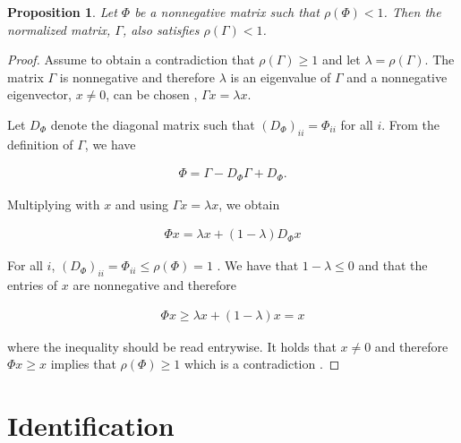 \documentclass[accepted]{uai2021} %
\newtheorem{prop}[thm]{Proposition}
\begin{document}
\begin{prop}
	Let $\Phi$ be a nonnegative matrix such that $\rho(\Phi) < 1$. Then the 
	normalized matrix, $\Gamma$, also satisfies $\rho(\Gamma) < 1$. 
\end{prop}

\begin{proof}
	Assume to obtain a contradiction that $\rho(\Gamma) \geq 1$ and let 
	$\lambda = \rho(\Gamma)$. The matrix $\Gamma$ is nonnegative and therefore 
	$\lambda$ is an eigenvalue of $\Gamma$ and a nonnegative eigenvector, $x 
	\neq 0$, 
	can be chosen \citep[Theorem 8.3.1]{horn1985}, $\Gamma x = \lambda x$.
	
	Let $D_\Phi$ denote the diagonal matrix such that $(D_{\Phi})_{ii} = 
	\Phi_{ii}$ for all $i$. From the definition of $\Gamma$, we have
	
	\begin{align*}
		\Phi= \Gamma - D_\Phi\Gamma + D_\Phi.
	\end{align*}
	
	Multiplying with $x$ and using $\Gamma x = \lambda x$, we obtain
	
	\begin{align*}
		\Phi x = \lambda x + (1- \lambda)D_\Phi x
	\end{align*}
	
	For all $i$, $(D_\Phi)_{ii} = \Phi_{ii}\leq \rho(\Phi) = 1$ 
	\citep[Corollary 
	8.1.20]{horn1985}. We have that $1 - \lambda \leq 0$ and that the entries 
	of $x$ are nonnegative and therefore
	
	\begin{align*}
		\Phi x \geq \lambda x  + (1- \lambda) x = x
	\end{align*}
	
	where the inequality should be read entrywise. It holds that $x \neq 0$ and 
	therefore $\Phi x \geq x$ implies that $\rho(\Phi) \geq 1$ which is a 
	contradiction \citep[Theorem 8.3.2]{horn1985}.
\end{proof}



\section{Identification}
\label{sec:id}
\end{document}
